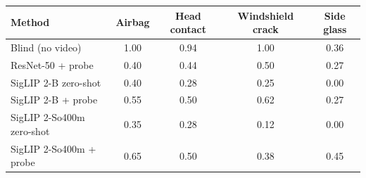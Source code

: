 \begin{tabular}{lcccc}
\toprule
Method & Airbag & Head contact & Windshield crack & Side glass \\
\midrule
Blind (no video) & 1.00 & 0.94 & 1.00 & 0.36 \\
ResNet-50 + probe & 0.40 & 0.44 & 0.50 & 0.27 \\
SigLIP 2-B zero-shot & 0.40 & 0.28 & 0.25 & 0.00 \\
SigLIP 2-B + probe & 0.55 & 0.50 & 0.62 & 0.27 \\
SigLIP 2-So400m zero-shot & 0.35 & 0.28 & 0.12 & 0.00 \\
SigLIP 2-So400m + probe & 0.65 & 0.50 & 0.38 & 0.45 \\
\bottomrule
\end{tabular}
